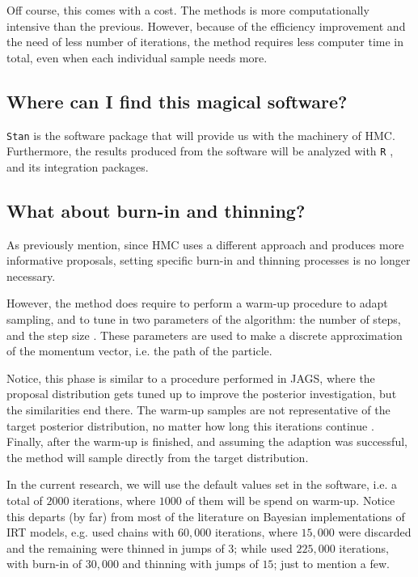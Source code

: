 Off course, this comes with a cost. The methods is more computationally intensive than the previous. However, because of the efficiency improvement and the need of less number of iterations, the method requires less computer time in total, even when each individual sample needs more.


\subsection{Where can I find this magical software?}

\texttt{Stan} \cite{Stan2020} is the software package that will provide us with the machinery of HMC. Furthermore, the results produced from the software will be analyzed with \texttt{R} \cite{R2015, RStan2020}, and its integration packages. 


\subsection{What about burn-in and thinning?}

As previously mention, since HMC uses a different approach and produces more informative proposals, setting specific burn-in and thinning processes is no longer necessary.

However, the method does require to perform a warm-up procedure to adapt sampling, and to tune in two parameters of the algorithm: the number of steps, and the step size \cite{Stan2020}. These parameters are used to make a discrete approximation of the momentum vector, i.e. the path of the particle. 

Notice, this phase is similar to a procedure performed in JAGS, where the proposal distribution gets tuned up to improve the posterior investigation, but the similarities end there. The warm-up samples are not representative of
the target posterior distribution, no matter how long this iterations continue \cite{McElreath_2020}. Finally, after the warm-up is finished, and assuming the adaption was successful, the method will sample directly from the target distribution.

In the current research, we will use the default values set in the software, i.e. a total of $2000$ iterations, where $1000$ of them will be spend on warm-up. Notice this departs (by far) from most of the literature on Bayesian implementations of IRT models, e.g. \citet{Fujimoto_2018a} used chains with $60,000$ iterations, where $15,000$ were discarded and the remaining were thinned in jumps of $3$; while \citet{Fujimoto_2018b} used $225,000$ iterations, with burn-in of $30,000$ and thinning with jumps of $15$; just to mention a few.


